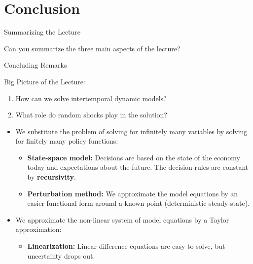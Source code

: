 \documentclass[10pt,c,aspectratio=1610,handout]{beamer}
\begin{document}
\section{Conclusion}%
\begin{frame}{Summarizing the Lecture}%
  \begin{center}%
    \begin{large}%
      Can you summarize the three main aspects of the lecture?%
    \end{large}%
  \end{center}%
\end{frame}%
\begin{frame}{Concluding Remarks}%
  \begin{block}{Big Picture of the Lecture:}%
    \begin{enumerate}%
      \item How can we solve intertemporal dynamic models?%
      \item What role do random shocks play in the solution?%
    \end{enumerate}%
  \end{block}%
  \pause%
  \begin{itemize}%
    \item[$\blacktriangleright$] We substitute the problem of solving for infinitely many variables by solving for finitely many policy functions:%
    \begin{itemize}%
      \item[$\rightarrow$] \textbf{State-space model:} Decisions are based on the state of the economy today and expectations about the future. The decision rules are constant by \textbf{recursivity}.%
      \item[$\rightarrow$] \textbf{Perturbation method:} We approximate the model equations by an easier functional form around a known point (deterministic steady-state).%
    \end{itemize}%
    \vspace*{0.1in}%
    \pause%
    \item[$\blacktriangleright$] We approximate the non-linear system of model equations by a Taylor approximation:%
    \begin{itemize}%
      \item[$\rightarrow$] \textbf{Linearization:} Linear difference equations are easy to solve, but uncertainty drops out.%

\end{itemize}
\end{itemize}
\end{frame}
\end{document}
